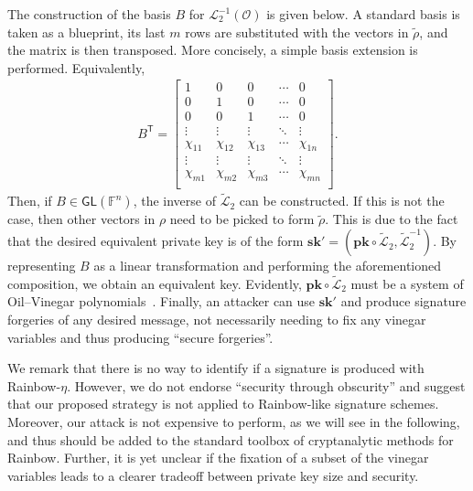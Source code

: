 \documentclass[draft, 12pt, a4paper, oneside]{memoir}
\theoremstyle{definition}
\begin{document}
The construction of the basis $B$ for $\mathcal{L}_{2}^{-1}(\mathcal{O})$ is given below. A standard basis is taken as a blueprint, its last $m$ rows are substituted with the vectors in $\widetilde{\rho}$, and the matrix is then transposed. More concisely, a simple basis extension is performed. Equivalently,
\begin{align*}
  B^{\mathsf{T}} = \begin{bmatrix}
    1 & 0 & 0 & \cdots & 0 \\
    0 & 1 & 0 & \cdots & 0 \\
    0 & 0 & 1 & \cdots & 0 \\
    \vdots & \vdots & \vdots & \ddots & \vdots \\
    \chi_{11} & \chi_{12} & \chi_{13} & \cdots & \chi_{1n} \\
        \vdots & \vdots & \vdots & \ddots & \vdots \\
    \chi_{m1} & \chi_{m2} & \chi_{m3} & \cdots & \chi_{mn} \\
  \end{bmatrix}.
\end{align*}
Then, if $B \in \mathsf{GL}(\mathbb{F}^{n})$, the inverse of $\widetilde{\mathcal{L}}_{2}$ can be constructed. If this is not the case, then other vectors in $\rho$ need to be picked to form $\widetilde{\rho}$. This is due to the fact that the desired equivalent private key is of the form $\mathbf{sk'} = (\mathbf{pk} \circ \widetilde{\mathcal{L}}_{2}, \widetilde{\mathcal{L}}_{2}^{-1})$. By representing $B$ as a linear transformation and performing the aforementioned composition, we obtain an equivalent key. Evidently, $\mathbf{pk} \circ \widetilde{\mathcal{L}}_{2}$ must be a system of Oil--Vinegar polynomials~\cite[Theorem 1]{Beullens:201706}. Finally, an attacker can use $\mathbf{sk'}$ and produce signature forgeries of any desired message, not necessarily needing to fix any vinegar variables and thus producing ``secure forgeries''.

We remark that there is no way to identify if a signature is produced with Rainbow-$\eta$. However, we do not endorse ``security through obscurity'' and suggest that our proposed strategy is not applied to Rainbow-like signature schemes. Moreover, our attack is not expensive to perform, as we will see in the following, and thus should be added to the standard toolbox of cryptanalytic methods for Rainbow. Further, it is yet unclear if the fixation of a subset of the vinegar variables leads to a clearer tradeoff between private key size and security.





\end{document}
